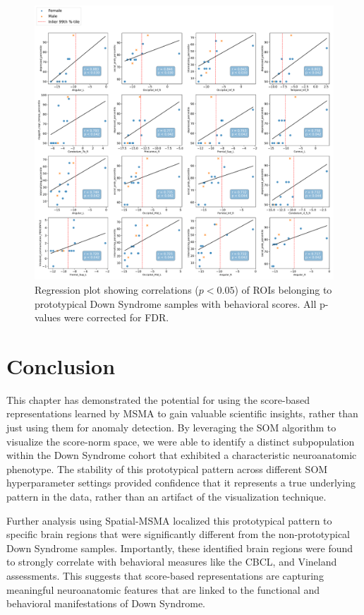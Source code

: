 \begin{figure}[tbhp]
\centering
\includegraphics[width=\textwidth]{figures/regplot-1.pdf}
\caption{Regression plot showing correlations ($p < 0.05$) of ROIs belonging to prototypical Down Syndrome samples with behavioral scores. All p-values were corrected for FDR.}
\label{fig:roi-scatter}
\end{figure}


\section{Conclusion}

This chapter has demonstrated the potential for using the score-based representations learned by MSMA to gain valuable scientific insights, rather than just using them for anomaly detection. By leveraging the SOM algorithm to visualize the score-norm space, we were able to identify a distinct subpopulation within the Down Syndrome cohort that exhibited a characteristic neuroanatomic phenotype. The stability of this prototypical pattern across different SOM hyperparameter settings provided confidence that it represents a true underlying pattern in the data, rather than an artifact of the visualization technique.

Further analysis using Spatial-MSMA localized this prototypical pattern to specific brain regions that were significantly different from the non-prototypical Down Syndrome samples. Importantly, these identified brain regions were found to strongly correlate with behavioral measures like the CBCL, and Vineland assessments. This suggests that score-based representations are capturing meaningful neuroanatomic features that are linked to the functional and behavioral manifestations of Down Syndrome.

